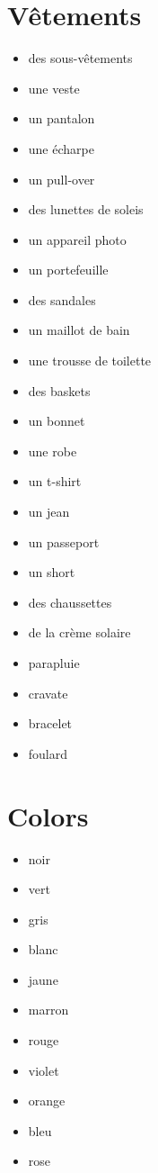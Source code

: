 \documentclass[palatino]{nicenotes}
\begin{document}
\section{V\^etements}

\begin{multicols}{3}
\begin{itemize}
\item des sous-v\^etements
\item une veste
\item un pantalon
\item une écharpe
\item un pull-over
\item des lunettes de soleis
\item un appareil photo
\item un portefeuille
\item des sandales
\item un maillot de bain
\item une trousse de toilette
\item des baskets
\item un bonnet
\item une robe
\item un t-shirt
\item un jean
\item un passeport
\item un short
\item des chaussettes
\item de la crème solaire
\item parapluie
\item cravate
\item bracelet
\item foulard
\end{itemize}
\end{multicols}

\section{Colors}

\begin{multicols}{3}
\begin{itemize}
\item noir
\item vert
\item gris
\item blanc
\item jaune
\item marron
\item rouge
\item violet
\item orange
\item bleu
\item rose
\end{itemize}
\end{multicols}
\end{document}

